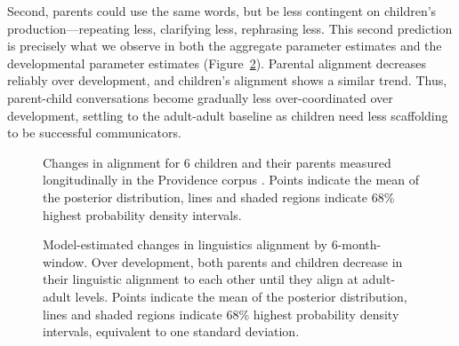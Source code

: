 \documentclass[10pt,letterpaper]{article}
\begin{document}
Second, parents could use the same words, but be less contingent on children's production---repeating less, clarifying less, rephrasing less. This second prediction is precisely what we observe in both the aggregate parameter estimates and the developmental parameter estimates (Figure~\ref{fig:all_hpds}). Parental alignment decreases reliably over development, and children's alignment shows a similar trend. Thus, parent-child conversations become gradually less over-coordinated over development, settling to the adult-adult baseline as children need less scaffolding to be successful communicators.


\begin{figure}[tb]
  \caption{\label{fig:providence_hpds} Changes in alignment for 6 children and their parents measured longitudinally in the Providence corpus \cite{demuth2006}. Points indicate the mean of the posterior distribution, lines and shaded regions indicate 68\% highest probability density intervals.}
\end{figure}



\begin{figure}[tb]
	\caption{Model-estimated changes in linguistics alignment by 6-month-window. Over development, both parents and children decrease in their linguistic alignment to each other until they align at adult-adult levels. Points indicate the mean of the posterior distribution, lines and shaded regions indicate 68\% highest probability density intervals, equivalent to one standard deviation.
\label{fig:all_hpds} }
\end{figure}
\end{document}
